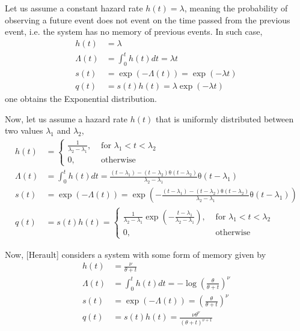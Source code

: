 \documentclass[10pt,a4paper]{article}
\newcommand{\heaviside}[1]{\mathrm{\theta}\left( #1 \right)}
\begin{document}
  \smallskip

  Let us assume a constant hazard rate $h(t)=\lambda$, meaning the probability
  of observing a future event does not event on the time passed from the previous
  event, i.e. the system has no memory of previous events. In such case,
  \begin{align}
    h(t) &= \lambda
    \\
    \Lambda(t) &= \int_0^t h(t) dt = \lambda t
    \\
    s(t) &= \exp{(-\Lambda(t))} = \exp{(-\lambda t)}
    \\
    q(t) &= s(t)h(t) = \lambda \exp{(-\lambda t)}
  \end{align}
  one obtains the Exponential distribution.

  Now, let us assume a hazard rate $h(t)$ that is uniformly distributed between
  two values $\lambda_1$ and $\lambda_2$,
  \begin{align}
    h(t) &=
    \begin{cases}
      \frac{1}{\lambda_2 - \lambda_1},& \mbox{ for } \lambda_1 < t < \lambda_2
      \\
      0 ,&\mbox{ otherwise }
    \end{cases}
    \\
    \Lambda(t) &= \int_0^t h(t) dt =
    \frac{(t - \lambda_1) - (t - \lambda_2)\heaviside{t - \lambda_2}}{\lambda_2 - \lambda_1} \heaviside{t - \lambda_1}
    \\
    s(t) &= \exp{(-\Lambda(t))} = \exp{\left(
    -\frac{(t - \lambda_1) - (t - \lambda_2)\heaviside{t - \lambda_2}}{\lambda_2 - \lambda_1} \heaviside{t - \lambda_1}
    \right)}
    \\
    q(t) &= s(t)h(t) =
    \begin{cases}
      \frac{1}{\lambda_2 - \lambda_1}
      \exp{\left(
      -\frac{t - \lambda_1}{\lambda_2 - \lambda_1}
      \right)},& \mbox{ for } \lambda_1 < t < \lambda_2
      \\
      0 ,&\mbox{ otherwise }
    \end{cases}
  \end{align}

  Now, [Herault] considers a system with some form of memory given by
  \begin{align}
    h(t) &= \frac{\nu}{\theta + t}
    \\
    \Lambda(t) &= \int_0^t h(t) dt = -\log{\left(\frac{\theta}{\theta + t}\right)^\nu}
    \\
    s(t) &= \exp{(-\Lambda(t))} = \left(\frac{\theta}{\theta + t}\right)^\nu
    \\
    q(t) &= s(t)h(t) = \frac{\nu \theta^\nu }{(\theta + t)^{\nu+1}}
  \end{align}
\end{document}

